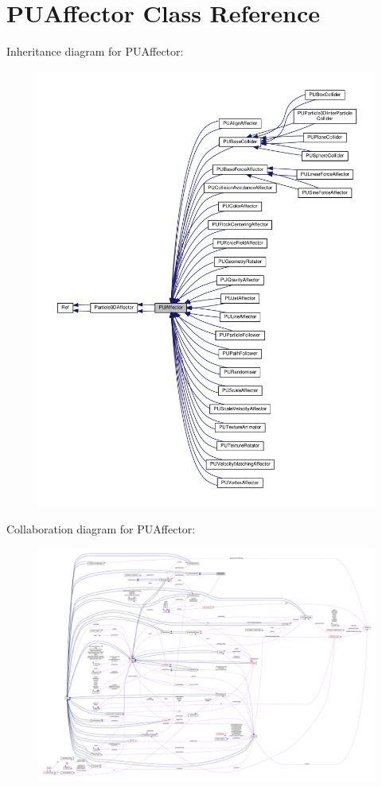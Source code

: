 \hypertarget{classPUAffector}{}\section{P\+U\+Affector Class Reference}
\label{classPUAffector}


Inheritance diagram for P\+U\+Affector\+:
\nopagebreak
\begin{figure}[H]
\begin{center}
\leavevmode
\includegraphics[width=350pt]{classPUAffector__inherit__graph}
\end{center}
\end{figure}


Collaboration diagram for P\+U\+Affector\+:
\nopagebreak
\begin{figure}[H]
\begin{center}
\leavevmode
\includegraphics[width=350pt]{classPUAffector__coll__graph}
\end{center}
\end{figure}
